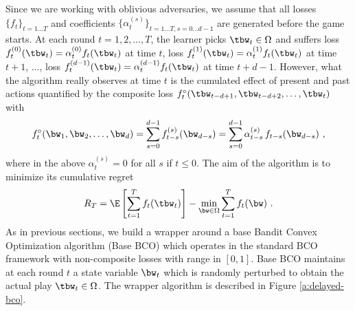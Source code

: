Since we are working with oblivious adversaries, we assume that all losses $\{f_{t}\}_{t=1\dots T}$ and coefficients $\{\alpha^{(s)}_{t}\}_{t=1\dots T,s=0\dots d-1}$ are generated before the game starts. At each round $t= 1, 2, \ldots, T$, the learner picks $\tbw_t \in \Omega$ and suffers loss $f^{(0)}_t(\tbw_t) = \alpha^{(0)}_{t}f_t(\tbw_t)$ at time $t$, loss $f^{(1)}_{t}(\tbw_t) =  \alpha^{(1)}_{t} f_{t}(\tbw_t)$ at time $t+1$, $\ldots$, loss $f^{(d-1)}_t(\tbw_t) =  \alpha^{(d-1)}_{t}f_t(\tbw_t)$ at time $t+d-1$. However, what the algorithm really observes at time $t$ is the cumulated effect of present and past actions quantified by the composite loss
\(
\fcomp_t(\tbw_{t-d+1},\tbw_{t-d+2},\ldots, \tbw_t)
\)
with 
\[
\fcomp_t(\bw_{1},\bw_{2},\ldots, \bw_d)= \sum_{s=0}^{d-1} f_{t-s}^{(s)}(\bw_{d-s}) = \sum_{s=0}^{d-1} \alpha_{t-s}^{(s)}\,f_{t-s}(\bw_{d-s})~,
\]
where in the above $\alpha_t^{(s)} = 0$ for all $s$ if $t \leq 0$.
The aim of the algorithm is to minimize its cumulative regret 
\[
R_T = \E\left[\sum_{t=1}^T f_t(\tbw_{t})\right] - \min_{\bw \in \Omega} \sum_{t=1}^T f_t(\bw)~.
\] 
As in previous sections, we build a wrapper around a base Bandit Convex Optimization algorithm (Base BCO) which operates in the standard BCO framework with non-composite losses with range in $[0,1]$. Base BCO maintains at each round $t$ a state variable $\bw_t$ which is randomly perturbed to obtain the actual play $\tbw_t \in \Omega$. The wrapper algorithm is described in Figure \ref{a:delayed-bco}.
%
